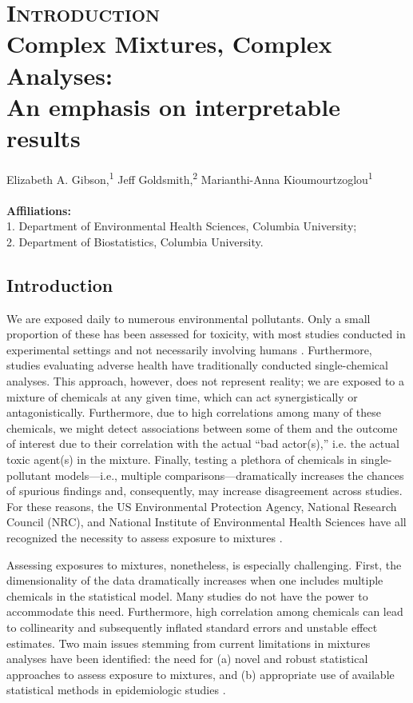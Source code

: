 \chapter[Introduction]{\textsc{Introduction} \\
\LARGE Complex Mixtures, Complex Analyses: \\
An emphasis on interpretable results}

\begin{center}
Elizabeth A. Gibson,\textsuperscript{1} 
Jeff Goldsmith,\textsuperscript{2} 
Marianthi-Anna Kioumourtzoglou\textsuperscript{1} \\
\ \\
\textbf{Affiliations:} \\ 1. Department of Environmental Health Sciences, Columbia University; \\ 2. Department of Biostatistics, Columbia University.
\end{center}

\clearpage

\section{Introduction}\label{sec:Intro}

We are exposed daily to numerous environmental pollutants. Only a small proportion of these has been assessed for toxicity, with most studies conducted in experimental settings and not necessarily involving humans \citep{grandjean06}. Furthermore, studies evaluating adverse health have traditionally conducted single-chemical analyses. This approach, however, does not represent reality; we are exposed to a mixture of chemicals at any given time, which can act synergistically or antagonistically. Furthermore, due to high correlations among many of these chemicals, we might detect associations between some of them and the outcome of interest due to their correlation with the actual ``bad actor(s),'' i.e. the actual toxic agent(s) in the mixture. Finally, testing a plethora of chemicals in single-pollutant models---i.e., multiple comparisons---dramatically increases the chances of spurious findings and, consequently, may increase disagreement across studies. For these reasons, the US Environmental Protection Agency, National Research Council (NRC), and National Institute of Environmental Health Sciences have all recognized the necessity to assess exposure to mixtures \citep{epaSP, nrc, taylor16}.

Assessing exposures to mixtures, nonetheless, is especially challenging. First, the dimensionality of the data dramatically increases when one includes multiple chemicals in the statistical model. Many studies do not have the power to accommodate this need. Furthermore, high correlation among chemicals can lead to collinearity and subsequently inflated standard errors and unstable effect estimates. Two main issues stemming from current limitations in mixtures analyses have been identified: the need for (a) novel and robust statistical approaches to assess exposure to mixtures, and (b) appropriate use of available statistical methods in epidemiologic studies \citep{taylor16}.

